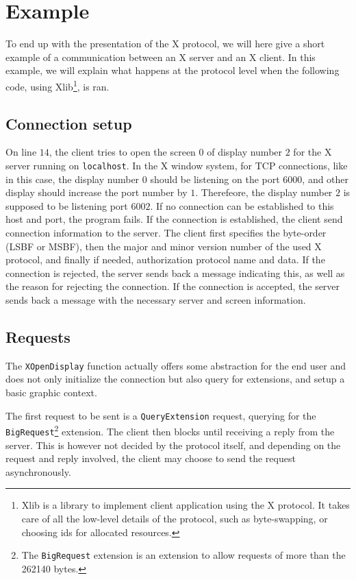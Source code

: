 \section{Example}
To end up with the presentation of the X protocol, we will here give a
short example of a communication between an X server and an X client. 
In this example, we will explain what happens at the protocol level 
when the following code, using Xlib\footnote{Xlib is a library to implement client
application using the X protocol. It takes care of all the low-level details of the 
protocol, such as byte-swapping, or choosing ids for allocated resources.}, is ran.
%

%
\subsection{Connection setup}
\label{ssec:connection-setup}
On line $14$, the client tries to open the screen $0$ of display number $2$
for the X server running on \lstinline{localhost}. In the X window system, for TCP connections,
like in this case, the display number $0$ should be listening on the port $6000$, and 
other display should increase the port number by $1$. Therefeore, the display number $2$ is 
supposed to be listening port $6002$. If no connection can be established to this host and port, 
the program fails. If the connection is established, the client send connection information to 
the server. The client first specifies the byte-order (LSBF or MSBF), then the major and 
minor version number of the used X protocol, and finally if needed, authorization protocol 
name and data.
%
If the connection is rejected, the server sends back a message indicating this, as well 
as the reason for rejecting the connection.
%
If the connection is accepted, the server sends back a message with the necessary server and 
screen information.
%
\subsection{Requests}
The \lstinline{XOpenDisplay} function actually offers some abstraction for the end user and
does not only initialize the connection but also query for extensions, and setup a basic 
graphic context. 

The first request to be sent is a \lstinline{QueryExtension} request, querying for the 
\lstinline{BigRequest}\footnote{The \lstinline{BigRequest} extension is 
  an extension to allow requests of more than the 262140 bytes.} extension. The client then blocks 
until receiving a reply from the server. This is however not decided by the protocol itself, 
and depending on the request and reply involved, the client may choose to send the request 
asynchronously.

